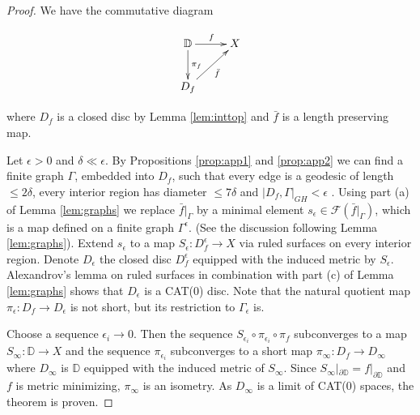 \documentclass[a4paper,12pt]{article}
\theoremstyle{remark}\newtheorem*{remark}{Remark}
\theoremstyle{definition}\newtheorem{definition}{Definition}
\newcommand{\DD}{\mathbb D}
\begin{document}
\begin{proof}
We have the commutative diagram

\begin{displaymath}
    \xymatrix{ \DD \ar[r]^f\ar[d]^{\pi_f} & X  \\
               D_f \ar[ru]_{\bar f} }
\end{displaymath}

where $D_f$ is a closed disc by Lemma \ref{lem:inttop} and $\bar f$ is a length preserving map. 

Let $\epsilon>0$ and $\delta\ll\epsilon$.
By Propositions \ref{prop:app1} and \ref{prop:app2}
we can find a finite graph $\Gamma$, embedded into $D_f$, such that 
every edge is a geodesic of length $\leq 2\delta$,
every interior region has diameter $\leq 7\delta$ and $|D_f,\Gamma|_{GH}<\epsilon$ .
Using part (a) of Lemma \ref{lem:graphs} we replace $\bar f|_\Gamma$ by a minimal element 
$s_\epsilon\in\mathcal{F}(\bar f|_\Gamma)$, which is a map defined on a finite graph 
$\Gamma^\epsilon$. (See the discussion following Lemma \ref{lem:graphs}).
Extend $s_\epsilon$ to a map $S_\epsilon:D_f^\epsilon\to X$ via ruled surfaces
on every interior region. Denote $D_\epsilon$ the closed disc $D_f^\epsilon$ equipped with
the induced metric by $S_\epsilon$. Alexandrov's lemma on ruled surfaces in combination with 
part (c) of Lemma \ref{lem:graphs} shows that $D_\epsilon$ is a CAT(0) disc.
Note that the natural quotient map $\pi_\epsilon:D_f\to D_\epsilon$ is not short, but its restriction
to $\Gamma_\epsilon$ is.

Choose a sequence $\epsilon_i\to 0$. Then the sequence $S_{\epsilon_i}\circ\pi_{\epsilon_i}\circ\pi_f$
subconverges to a map $S_\infty:\DD\to X$ and the sequence $\pi_{\epsilon_i}$ subconverges to a short map
$\pi_\infty:D_f\to D_\infty$ where $D_\infty$ is $\DD$ equipped with the induced metric of $S_\infty$.
Since $S_\infty|_{\partial \DD}=f|_{\partial \DD}$ and $f$ is metric minimizing, 
$\pi_\infty$ is an isometry. As $D_\infty$ is a limit
of CAT(0) spaces, the theorem is proven.


\end{proof}
\end{document}
